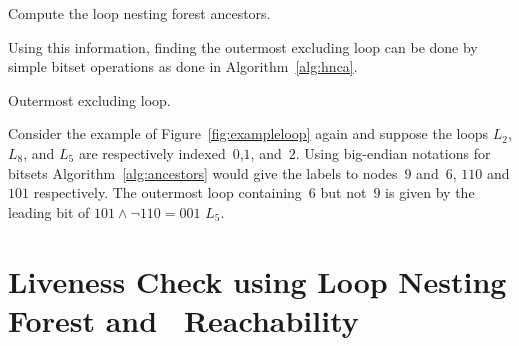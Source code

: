 \begin{algorithm}
\caption{Compute the loop nesting forest ancestors.}
\label{alg:ancestors}
\end{algorithm}

Using this information, finding the outermost excluding loop can be done by simple bitset operations as done in Algorithm~\ref{alg:hnca}.

\begin{algorithm}
\caption{Outermost excluding loop.}
\label{alg:hnca}
\end{algorithm}

\begin{example}
	Consider the example of Figure~\ref{fig:exampleloop} again and suppose the loops $L_2$, $L_8$, and $L_5$ are respectively indexed~$0$,$1$, and~$2$.
	Using big-endian notations for bitsets Algorithm~\ref{alg:ancestors} would give the labels to nodes~$9$ and~$6$, $110$ and $101$ respectively.
	The outermost loop containing~$6$ but not~$9$ is given by the leading bit of $101\wedge \lnot 110=001$ \ie $L_5$.
\end{example}



\section{Liveness Check using Loop Nesting Forest and \Reduced\ Reachability}
\label{sec:live-check}


